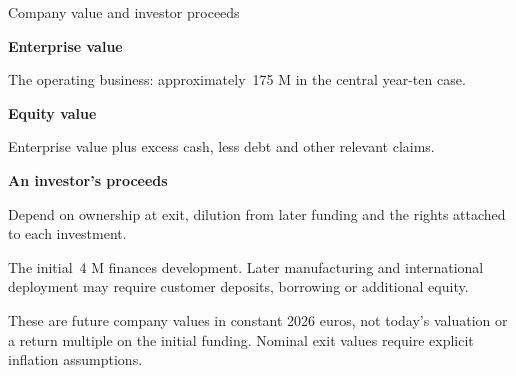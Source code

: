 \documentclass[aspectratio=169,11pt]{beamer}
\newcommand{\hi}[1]{\textcolor{crRed}{#1}}
\newcommand{\gap}{\par\vspace{2mm}}
\begin{document}
\begin{frame}{Company value and investor proceeds}

\small
\textbf{Enterprise value}\gap
The operating business: approximately \hi{\EUR\,175 M} in the central year-ten case.
\gap
\textbf{Equity value}\gap
Enterprise value plus excess cash, less debt and other relevant claims.
\gap
\textbf{An investor's proceeds}\gap
Depend on ownership at exit, dilution from later funding and the rights attached to each investment.
\gap
The initial \EUR\,4 M finances development. Later manufacturing and international deployment may require customer deposits, borrowing or additional equity.
\gap
{\footnotesize These are future company values in constant 2026 euros, not today's valuation or a return multiple on the initial funding. Nominal exit values require explicit inflation assumptions.}
\end{frame}
\end{document}
